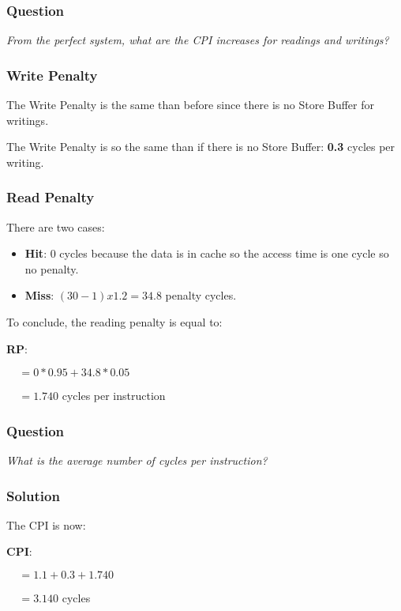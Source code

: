 
\begin{frame}
  \frametitle{Question}

  \textit{From the perfect system, what are the CPI increases for
    readings and writings?}
\end{frame}


\begin{frame}
  \frametitle{Write Penalty}

  The Write Penalty is the same than before since there is no Store
  Buffer for writings.

  \nl

  The Write Penalty is so the same than if there is no Store Buffer:
  \textbf{0.3} cycles per writing.
\end{frame}


\begin{frame}[containsverbatim]
  \frametitle{Read Penalty}

  There are two cases:

  \begin{itemize}
    \item
      \textbf{Hit}: 0 cycles because the data is in cache so the access time
      is one cycle so no penalty.
    \item
      \textbf{Miss}: $(30 - 1) x 1.2 = 34.8$ penalty cycles.
  \end{itemize}

  To conclude, the reading penalty is equal to:

  \nl

  \textbf{RP}:

  $~~~~~= 0 * 0.95 + 34.8 * 0.05$

  $~~~~~= 1.740$ cycles per instruction
\end{frame}


\begin{frame}
  \frametitle{Question}

  \textit{What is the average number of cycles per instruction?}
\end{frame}


\begin{frame}
  \frametitle{Solution}

  The CPI is now:

  \nl

  \textbf{CPI}:

  $~~~~~= 1.1 + 0.3 + 1.740$

  $~~~~~= 3.140$ cycles
\end{frame}

